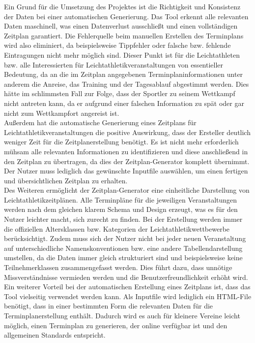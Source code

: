 Ein Grund für die Umsetzung des Projektes ist die Richtigkeit und Konsistenz der Daten bei einer automatischen Generierung. Das Tool erkennt alle relevanten Daten maschinell, was einen Datenverlust ausschließt und einen vollständigen Zeitplan garantiert. Die Fehlerquelle beim manuellen Erstellen des Terminplans wird also eliminiert, da beispielsweise Tippfehler oder falsche bzw. fehlende Eintragungen nicht mehr möglich sind. Dieser Punkt ist für die Leichtathleten bzw. alle Interessierten für Leichtathletikveranstaltungen von essentieller Bedeutung, da an die im Zeitplan angegebenen Terminplaninformationen unter anderem die Anreise, das Training und der Tagesablauf abgestimmt werden. Dies hätte im schlimmsten Fall zur Folge, dass der Sportler zu seinem Wettkampf nicht antreten kann, da er aufgrund einer falschen Information zu spät oder gar nicht zum Wettkampfort angereist ist.\\
Außerdem hat die automatische Generierung eines Zeitplans für Leichtathletikveranstaltungen die positive Auswirkung, dass der Ersteller deutlich weniger Zeit für die Zeitplanerstellung benötigt. Es ist nicht mehr erforderlich mühsam alle relevanten Informationen zu identifizieren und diese anschließend in den Zeitplan zu übertragen, da dies der Zeitplan-Generator komplett übernimmt. Der Nutzer muss lediglich das gewünschte Inputfile auswählen, um einen fertigen und übersichtlichen Zeitplan zu erhalten. \\
Des Weiteren ermöglicht der Zeitplan-Generator eine einheitliche Darstellung von Leichtathletikzeitplänen. Alle Terminpläne für die jeweiligen Veranstaltungen werden nach dem gleichen klarem Schema und Design erzeugt, was es für den Nutzer leichter macht, sich zurecht zu finden. Bei der Erstellung werden immer die offiziellen Altersklassen bzw. Kategorien der Leichtathletikwettbewerbe berücksichtigt. Zudem muss sich der Nutzer nicht bei jeder neuen Veranstaltung auf unterschiedliche Namenskonventionen bzw. eine andere Tabellendarstellung umstellen, da die Daten immer gleich strukturiert sind und beispielsweise keine Teilnehmerklassen zusammengefasst werden. Dies führt dazu, dass unnötige Missverständnisse vermieden werden und die Benutzerfreundlichkeit erhöht wird.\\
Ein weiterer Vorteil bei der automatischen Erstellung eines Zeitplans ist, dass das Tool vielseitig verwendet werden kann. Als Inputfile wird lediglich ein HTML-File benötigt, dass in einer bestimmten Form die relevanten Daten für die Terminplanerstellung enthält. Dadurch wird es auch für kleinere Vereine leicht möglich, einen Terminplan zu generieren, der online verfügbar ist und den allgemeinen Standards entspricht.\\
